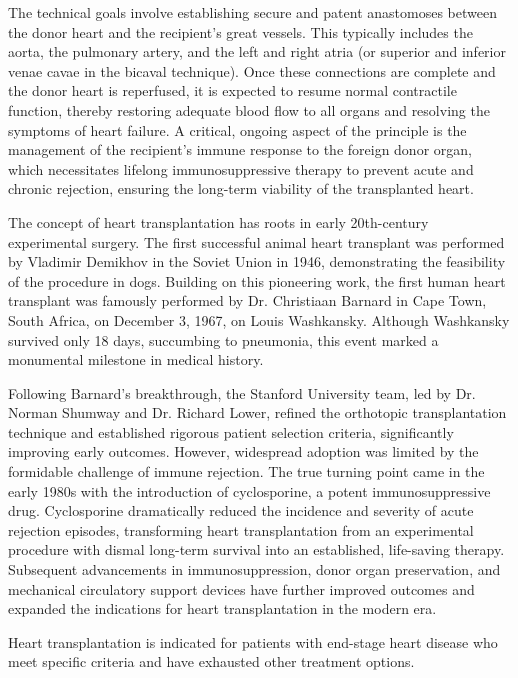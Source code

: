 The technical goals involve establishing secure and patent anastomoses between the donor heart and the recipient's great vessels. This typically includes the aorta, the pulmonary artery, and the left and right atria (or superior and inferior venae cavae in the bicaval technique). Once these connections are complete and the donor heart is reperfused, it is expected to resume normal contractile function, thereby restoring adequate blood flow to all organs and resolving the symptoms of heart failure. A critical, ongoing aspect of the principle is the management of the recipient's immune response to the foreign donor organ, which necessitates lifelong immunosuppressive therapy to prevent acute and chronic rejection, ensuring the long-term viability of the transplanted heart.

The concept of heart transplantation has roots in early 20th-century experimental surgery. The first successful animal heart transplant was performed by Vladimir Demikhov in the Soviet Union in 1946, demonstrating the feasibility of the procedure in dogs. Building on this pioneering work, the first human heart transplant was famously performed by Dr. Christiaan Barnard in Cape Town, South Africa, on December 3, 1967, on Louis Washkansky. Although Washkansky survived only 18 days, succumbing to pneumonia, this event marked a monumental milestone in medical history.

Following Barnard's breakthrough, the Stanford University team, led by Dr. Norman Shumway and Dr. Richard Lower, refined the orthotopic transplantation technique and established rigorous patient selection criteria, significantly improving early outcomes. However, widespread adoption was limited by the formidable challenge of immune rejection. The true turning point came in the early 1980s with the introduction of cyclosporine, a potent immunosuppressive drug. Cyclosporine dramatically reduced the incidence and severity of acute rejection episodes, transforming heart transplantation from an experimental procedure with dismal long-term survival into an established, life-saving therapy. Subsequent advancements in immunosuppression, donor organ preservation, and mechanical circulatory support devices have further improved outcomes and expanded the indications for heart transplantation in the modern era.

Heart transplantation is indicated for patients with end-stage heart disease who meet specific criteria and have exhausted other treatment options.

